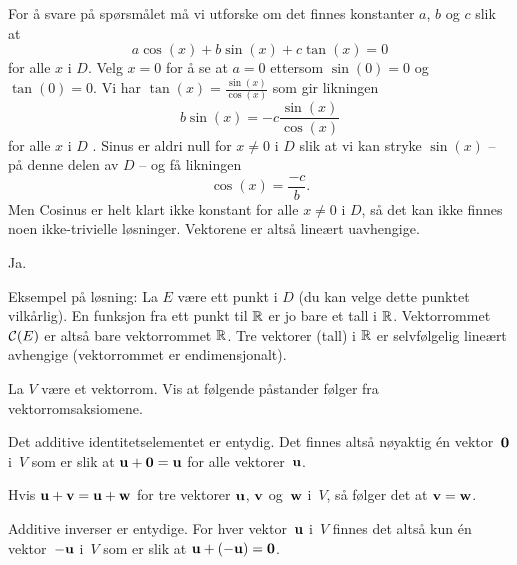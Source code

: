 \begin{losning}
\begin{punkt}
For å svare på spørsmålet må vi utforske om det finnes konstanter $a$, $b$ og $c$ slik at $$a\cos(x)+b\sin(x)+c\tan(x)=0$$ for alle $x$ i $D$. Velg $x=0$ for å se at $a=0$ ettersom $\sin(0)=0$ og $\tan(0)=0$. Vi har $\tan(x)=\frac{\sin(x)}{\cos(x)}$ som gir likningen $$b\sin(x)=-c\frac{\sin(x)}{\cos(x)}$$ for alle $x$ i $D$ . Sinus er aldri null for $x\neq 0$ i $D$ slik at vi kan stryke $\sin(x)$ -- på denne delen av $D$ -- og få likningen $$\cos(x)=\frac{-c}{b}.$$ Men Cosinus er helt klart ikke konstant for alle $x\neq 0$ i $D$, så det kan ikke finnes noen ikke-trivielle løsninger. Vektorene er altså lineært uavhengige.
\end{punkt}

\begin{punkt}
Ja. 

\noindent
Eksempel på løsning: La $E$ være ett punkt i $D$ (du kan velge dette punktet vilkårlig). En funksjon fra ett punkt til $\mathbb{R}$ er jo bare et tall i $\mathbb{R}$. Vektorrommet $\mathcal{C}(E)$ er altså bare vektorrommet $\mathbb{R}$. Tre vektorer (tall) i $\mathbb{R}$ er selvfølgelig lineært avhengige (vektorrommet er endimensjonalt).
\end{punkt}

\end{losning}


\begin{oppgave}
La $V$ være et vektorrom.
Vis at følgende påstander følger fra vektorromsaksiomene.
\begin{punkt}
Det additive identitetselementet er entydig.  Det finnes altså
nøyaktig én vektor~$\mathbf{0}$ i~$V$ som er slik at
$\mathbf{u} + \mathbf{0} = \mathbf{u}$ for alle vektorer~$\mathbf{u}$.
\end{punkt}
\begin{punkt}
Hvis $\mathbf{u} + \mathbf{v} = \mathbf{u} + \mathbf{w}$ for tre vektorer $\mathbf{u}$, $\mathbf{v}$
og~$\mathbf{w}$ i~$V$, så følger det at $\mathbf{v} = \mathbf{w}$.
\end{punkt}
\begin{punkt}
Additive inverser er entydige.  For hver vektor~$\mathbf{u}$ i~$V$ finnes
det altså kun én vektor~$-\mathbf{u}$ i~$V$ som er slik at
$\mathbf{u} + (-\mathbf{u}) = \mathbf{0}$.
\end{punkt}
\end{oppgave}

